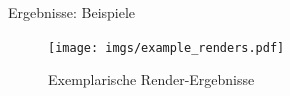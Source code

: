 
\begin{frame}{Ergebnisse: Beispiele}
    \begin{figure}
        \centering
        \texttt{[image: imgs/example\_renders.pdf]}
        \caption{Exemplarische Render-Ergebnisse}
    \end{figure}
\end{frame}

